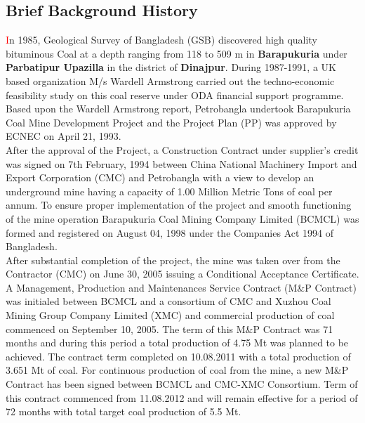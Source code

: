 \documentclass[11 pt]{article}
\begin{document}
\subsection{Brief Background History}
{\huge\textcolor{red}{\hspace{5 mm}I}}{\small n 1985, Geological Survey of Bangladesh (GSB) discovered high quality bituminous Coal at a depth ranging from 118 to 509 m in \textbf{Barapukuria} under \textbf{Parbatipur Upazilla} in the district of \textbf{Dinajpur}. During 1987-1991, a UK based organization M/s Wardell Armstrong carried out the techno-economic feasibility study on this coal reserve under ODA financial support programme. Based upon the Wardell Armstrong report, Petrobangla undertook Barapukuria Coal Mine Development Project and the Project Plan (PP) was approved by ECNEC on April 21, 1993.\\
After the approval of the Project, a Construction Contract under supplier’s credit was signed on 7th February, 1994 between China National Machinery Import and Export Corporation (CMC) and Petrobangla with a view to develop an underground mine having a capacity of 1.00 Million Metric Tons of coal per annum. To ensure proper implementation of the project and smooth functioning of the mine operation Barapukuria Coal Mining Company Limited (BCMCL) was formed and registered on August 04, 1998 under the Companies Act 1994 of Bangladesh.\\
After substantial completion of the project, the mine was taken over from the Contractor (CMC) on June 30, 2005 issuing a Conditional Acceptance Certificate. A Management, Production and Maintenances Service Contract (M\&P Contract) was initialed between BCMCL and a consortium of CMC and Xuzhou Coal Mining Group Company Limited (XMC) and commercial production of coal commenced on September 10, 2005. The term of this M\&P Contract was 71 months and during this period a total production of 4.75 Mt was planned to be achieved. The contract term completed on 10.08.2011 with a total production of 3.651 Mt of coal. For continuous production of coal from the mine, a new M\&P Contract has been signed between BCMCL and CMC-XMC Consortium. Term of this contract commenced from 11.08.2012 and will remain effective for a period of 72 months with total target coal production of 5.5 Mt.}
\end{document}

